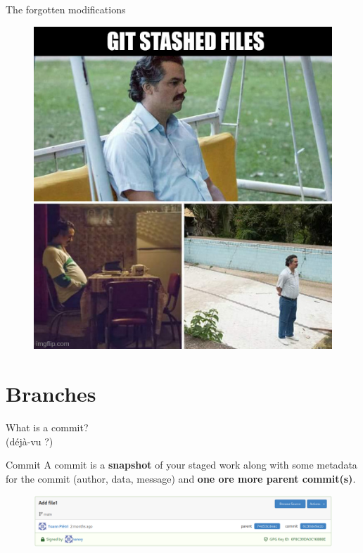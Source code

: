 \documentclass[10pt,aspectratio=169]{beamer}
\begin{document}
\begin{frame}[fragile]{The forgotten modifications}
    \begin{figure}
        \includegraphics[scale=0.35]{memes/meme-stashed.jpg}
    \end{figure}
\end{frame}

\section{Branches}

 {
  \begin{frame}
      What is a commit?\\ (déjà-vu ?)
  \end{frame}
 }

\begin{frame}[fragile]{Commit}
    A commit is a \textbf{snapshot} of your staged work along with some metadata for the commit (author, data, message) and \textbf{one ore more parent commit(s)}.

    \begin{figure}
        \centering
        \includegraphics[scale=0.35]{parent_commit.png}
    \end{figure}
\end{frame}
\end{document}
